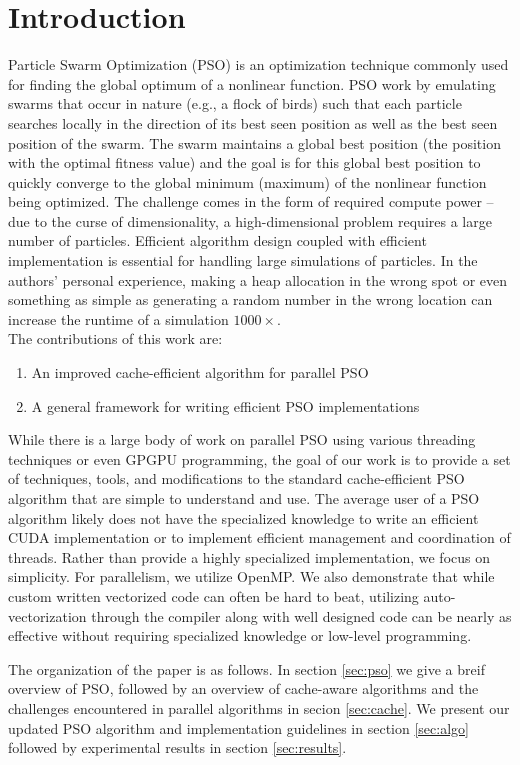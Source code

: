 \section{Introduction}
Particle Swarm Optimization (PSO) \cite{pso} is an optimization technique commonly used for
finding the global optimum of a nonlinear function. PSO work by emulating swarms
that occur in nature (e.g., a flock of birds) such that each particle searches
locally in the direction of its best seen position as well as the best seen
position of the swarm. The swarm maintains a global best position (the position
with the optimal fitness value) and the goal is for this global best position to
quickly converge to the global minimum (maximum) of the nonlinear function being
optimized.  The challenge comes in the form of required compute power -- due to
the curse of dimensionality, a high-dimensional problem requires a large number
of particles. Efficient algorithm design coupled with efficient implementation
is essential for handling large simulations of particles. In the authors'
personal experience, making a heap allocation in the wrong spot or even
something as simple as generating a random number in the wrong location can
increase the runtime of a simulation $1000\times$.\\
The contributions of this work are:
\begin{enumerate}
\item An improved cache-efficient algorithm for parallel PSO
\item A general framework for writing efficient PSO implementations
\end{enumerate}

While there is a large body of work on parallel PSO using various threading
techniques or even GPGPU programming, the goal of our work is to provide a set
of techniques, tools, and modifications to the standard cache-efficient PSO
algorithm that are simple to understand and use. The average user of a PSO
algorithm likely does not have the specialized knowledge to write an efficient
CUDA implementation or to implement efficient management and coordination of
threads. Rather than provide a highly specialized implementation, we focus on
simplicity. For parallelism, we utilize OpenMP. We also demonstrate that while
custom written vectorized code can often be hard to beat, utilizing
auto-vectorization through the compiler along with well designed code can be
nearly as effective without requiring specialized knowledge or low-level
programming.

The organization of the paper is as follows. In section \ref{sec:pso} we give a
breif overview of PSO, followed by an overview of cache-aware algorithms and the
challenges encountered in parallel algorithms in secion \ref{sec:cache}. We
present our updated PSO algorithm and implementation guidelines in section
\ref{sec:algo} followed by experimental results in section \ref{sec:results}.

